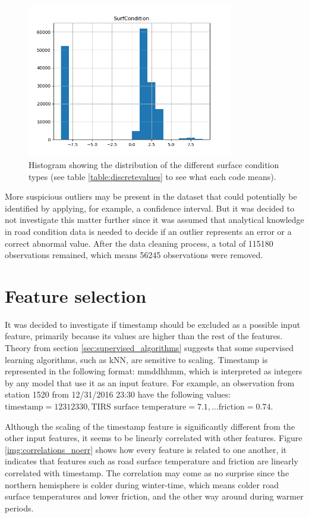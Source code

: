 \begin{figure}[H] 
	\centering
	\includegraphics[width=0.8\textwidth]{media/HistogramSurfaceStatus.png}
	\caption{Histogram showing the distribution of the different surface condition types (see table \ref{table:discretevalues} to see what each code means).}
	\label{img:histogram_surfstatus}
\end{figure}

	More suspicious outliers may be present in the dataset that could potentially be identified by applying, for example, a confidence interval. But it was decided to not investigate this matter further since it was assumed that analytical knowledge in road condition data is needed to decide if an outlier represents an error or a correct abnormal value. After the data cleaning process, a total of 115180 observations remained, which means 56245 observations were removed.


\section{Feature selection}
	It was decided to investigate if timestamp should be excluded as a possible input feature, primarily because its values are higher than the rest of the features. Theory from section \ref{sec:supervised_algorithms} suggests that some supervised learning algorithms, such as kNN, are sensitive to scaling. Timestamp is represented in the following format: mmddhhmm, which is interpreted as integers by any model that use it as an input feature. For example, an observation from station 1520 from 12/31/2016 23:30 have the following values: $\text{timestamp} = 12312330, \text{TIRS surface temperature}= 7.1, \dots \text{friction} = 0.74$. 

	Although the scaling of the timestamp feature is significantly different from the other input features, it seems to be linearly correlated with other features. Figure \ref{img:correlations_noerr} shows how every feature is related to one another, it indicates that features such as road surface temperature and friction are linearly correlated with timestamp. The correlation may come as no surprise since the northern hemisphere is colder during winter-time, which means colder road surface temperatures and lower friction, and the other way around during warmer periods. 

